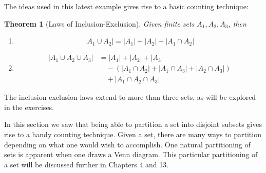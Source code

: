 \documentclass[10pt,]{book}
\theoremstyle{plain}
\newtheorem{theorem}{Theorem}[section]
\theoremstyle{definition}
\theoremstyle{definition}
\theoremstyle{definition}
\begin{document}
The ideas used in this latest example gives rise to a basic counting technique:
%
\begin{theorem}[Laws of Inclusion-Exclusion]\label{inclusion-exclusion}
Given finite sets \(A_1, A_2, A_3\), then%
\par
\leavevmode%
\begin{enumerate}
\item\hypertarget{ie2}{}\begin{equation*} \lvert A_1 \cup A_2 \rvert =\lvert A_1 \rvert + \lvert A_2 \rvert - \lvert A_1 \cap A_2 \rvert  \end{equation*}%
\item\hypertarget{ie3}{}
\begin{equation*} 
\begin{split}
 \lvert A_1 \cup A_2 \cup A_3 \rvert & =\lvert A_1 \rvert + \lvert A_2 \rvert + \lvert A_3 \rvert\\
&\quad - (\lvert A_1 \cap A_2 \rvert + \lvert A_1 \cap A_3 \rvert+ \lvert A_2 \cap A_3 \rvert)\\
&\quad + \lvert A_1 \cap A_2 \cap A_3 \rvert
\end{split} 
\end{equation*}%
\end{enumerate}
%
\end{theorem}
\par
The inclusion-exclusion laws extend to more than three sets, as will be explored in the exercises.%
\par
In this section we saw that being able to partition a set into disjoint subsets gives rise to a handy counting technique. Given a set, there are many ways to partition depending on what one would wish to accomplish. One natural partitioning of sets is apparent when one draws a Venn diagram. This particular partitioning of a set will be discussed further in Chapters 4 and 13.
%
\typeout{************************************************}
\typeout{************************************************}
\end{document}
